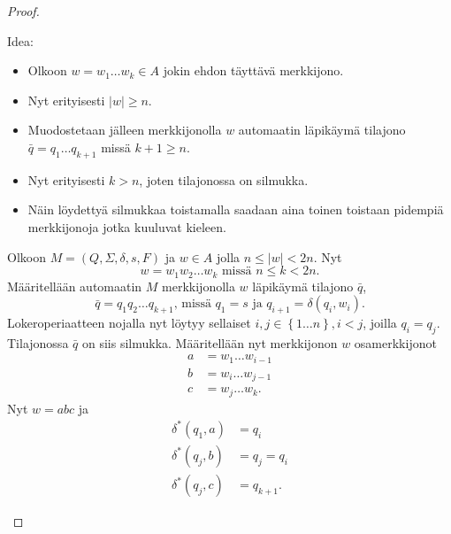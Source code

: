 \documentclass[a4paper,11pt,draft]{article}
\newcommand{\set}[1]{{\left\{ #1 \right\}}}
\begin{document}
\begin{enumerate}
\begin{enumerate}
\begin{proof}
\begin{description}
          Idea:
          \begin{itemize}
            \item Olkoon $w = w_1 \ldots w_k \in A$ jokin ehdon
              täyttävä merkkijono.
            \item Nyt erityisesti $|w| \ge n$.
            \item Muodostetaan jälleen merkkijonolla $w$ automaatin
              läpikäymä tilajono $\bar{q} = q_1 \ldots q_{k+1}$ missä
              $k+1 \ge n$.
            \item Nyt erityisesti $k > n$, joten tilajonossa on
              silmukka.
            \item Näin löydettyä silmukkaa toistamalla saadaan aina
              toinen toistaan pidempiä merkkijonoja jotka kuuluvat kieleen.
          \end{itemize}
          Olkoon $M = (Q, \Sigma, \delta, s, F)$ ja $w \in A$ jolla $n
          \le |w| < 2n$. Nyt
          \begin{equation*}
            w = w_1w_2 \ldots w_k \textrm{ missä } n \le k < 2n \textrm{.}
          \end{equation*}
          Määritellään automaatin $M$ merkkijonolla $w$ läpikäymä
          tilajono $\bar{q}$,
          \begin{equation*}
            \bar{q} = q_1q_2 \ldots q_{k+1}
            \textrm{, missä } q_1 = s
            \textrm{ ja } q_{i+1} = \delta(q_i, w_i) \textrm{.}
          \end{equation*}
          Lokeroperiaatteen nojalla nyt löytyy sellaiset $i,j \in
          \set{1 \ldots n}, i < j$, joilla $q_i = q_j$. Tilajonossa
          $\bar{q}$ on siis silmukka. Määritellään nyt merkkijonon $w$
          osamerkkijonot
          \begin{align*}
            a & = w_1 \ldots w_{i-1} \\
            b & = w_i \ldots w_{j-1} \\
            c & = w_j \ldots w_k \textrm{.}
          \end{align*}
          Nyt $w = abc$ ja
          \begin{align*}
            \delta^*(q_1,a) & = q_i \\
            \delta^*(q_j,b) & = q_j = q_i \\
            \delta^*(q_j,c) & = q_{k+1} \textrm{.}
          \end{align*}


\end{description}
\end{proof}
\end{enumerate}
\end{enumerate}
\end{document}
